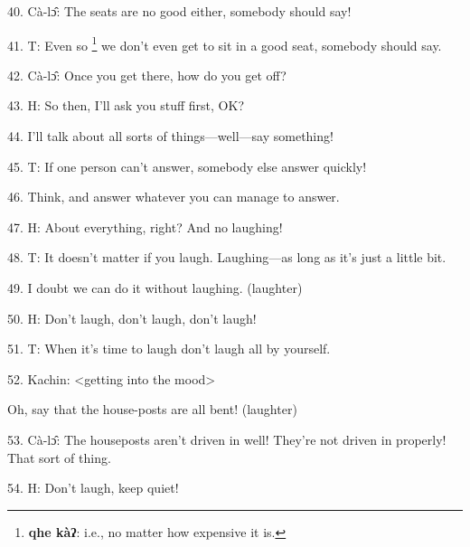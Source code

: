 40. Cà-lɔ̂: The seats are no good either, somebody should say!

41. T: Even so \footnote{\textbf{qhe kàʔ}: i.e., no matter how expensive it is.} we don't even get to sit in a good seat, somebody should say.

42. Cà-lɔ̂: Once you get there, how do you get off?

43. H: So then, I'll ask you stuff first, OK?

44. I'll talk about all sorts of things---well---say something!

45. T: If one person can't answer, somebody else answer quickly!

46. Think, and answer whatever you can manage to answer.

47. H: About everything, right?  And no laughing!

48. T: It doesn't matter if you laugh. Laughing---as long as it's just a little
bit.

49. I doubt we can do it without laughing. (laughter)

50. H: Don't laugh, don't laugh, don't laugh!

51. T: When it's time to laugh don't laugh all by yourself.

52. Kachin: <getting into the mood>

Oh, say that the house-posts are all bent! (laughter)

53. Cà-lɔ̂: The houseposts aren't driven in well!  They're not driven in properly!
That sort of thing.

54. H: Don't laugh, keep quiet!

